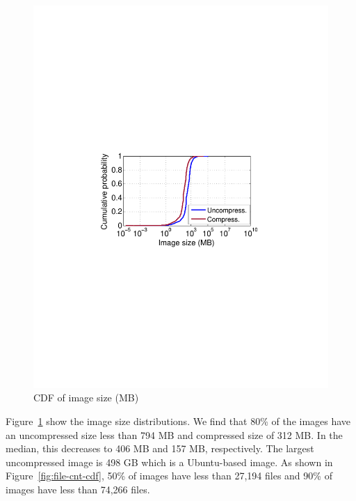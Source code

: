 \begin{figure}[t]
\begin{minipage}{0.23\textwidth}
		\includegraphics[width=1\textwidth]{graphs/image-size-cdf.pdf}
		\caption{CDF of image size (MB)}
		\label{fig:image-size-cdf}
	\end{minipage}%
\end{figure}

Figure~\ref{fig:image-size-cdf} show the image size distributions.
%
%
We find that 80\% of the images have an uncompressed size less than 794 MB and
compressed size of 312 MB.
%
In the median, this decreases to 406 MB and 157 MB, respectively.
%
The largest uncompressed image is 498 GB which is a Ubuntu-based image.
As shown in Figure~\ref{fig:file-cnt-cdf}, 50\% of images have less than 27,194 files 
and 90\% of images have less than 74,266 files.
%

